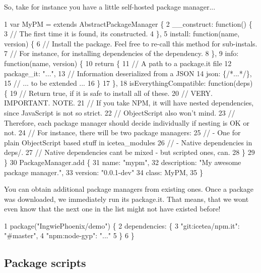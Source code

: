 So, take for instance you have a little self-\/hosted package manager... 
\begin{DoxyCode}
1 var MyPM = extends AbstractPackageManager \{
2     \_\_construct: function() \{
3         // The first time it is found, its constructed.
4     \},
5     install: function(name, version) \{
6         // Install the package. Feel free to re-call this method for sub-instals.
7         // For instance, for installing dependencies of the dependency.
8     \},
9     info: function(name, version) \{
10         return \{
11             // A path to a package.it file
12             package\_it: "...",
13             // Information deserialized from a JSON
14             json: \{/*...*/\},
15             // ... to be extended ...
16         \}
17     \},
18     isEverythingCompatible: function(deps) \{
19         // Return true, if it is safe to install all of these.
20         // VERY. IMPORTANT. NOTE.
21         // If you take NPM, it will have nested dependencies, since JavaScript is not so strict.
22         // ObjectScript also won't mind.
23         // Therefore, each package manager should decide individually if nesting is OK or not.
24         // For instance, there will be two package managers:
25         // - One for plain ObjectScript based stuff in icetea\_modules
26         // - Native dependencies in deps/.
27         // Native dependencies cant be mixed - but scripted ones, can.
28     \}
29 \}
30 PackageManager.add \{
31     name: "mypm",
32     description: "My awesome package manager.",
33     version: "0.0.1-dev"
34     class: MyPM,
35 \}
\end{DoxyCode}


You can obtain additional package managers from existing ones. Once a package was downloaded, we immediately run it\textquotesingle{}s {\ttfamily package.\+it}. That means, that we won\textquotesingle{}t even know that the next one in the list might not have existed before!


\begin{DoxyCode}
1 package("IngwiePhoenix/demo") \{
2     dependencies: \{
3         "git:icetea/npm.it": "#master",
4         "npm:node-gyp": "..."
5     \}
6 \}
\end{DoxyCode}


\subsection*{Package scripts}

